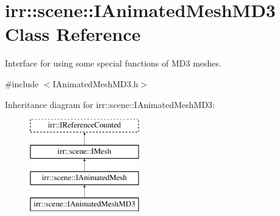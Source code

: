 \hypertarget{classirr_1_1scene_1_1IAnimatedMeshMD3}{}\section{irr\+:\+:scene\+:\+:I\+Animated\+Mesh\+M\+D3 Class Reference}
\label{classirr_1_1scene_1_1IAnimatedMeshMD3}


Interface for using some special functions of M\+D3 meshes.  




{\ttfamily \#include $<$I\+Animated\+Mesh\+M\+D3.\+h$>$}

Inheritance diagram for irr\+:\+:scene\+:\+:I\+Animated\+Mesh\+M\+D3\+:\begin{figure}[H]
\begin{center}
\leavevmode
\includegraphics[height=4.000000cm]{classirr_1_1scene_1_1IAnimatedMeshMD3}
\end{center}
\end{figure}
